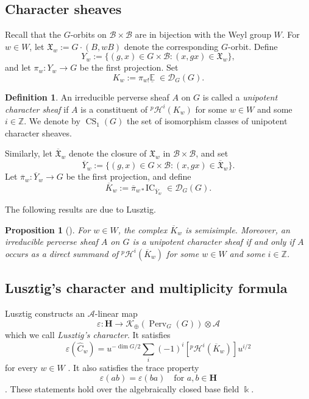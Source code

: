 \documentclass[11pt]{amsart}
\numberwithin{equation}{section}
\newtheorem{proposition}[theorem]{Proposition}
\theoremstyle{definition}
\newtheorem{definition}[theorem]{Definition}
\newcommand\hecke{\mathbf{H}}  %
\def\lra{\longrightarrow }
\def\beq{\begin{equation}}
\def\eeq{\end{equation}}
\DeclareMathOperator{\CS}{\mathrm{CS}}
\DeclareMathOperator{\Perv}{\mathrm{Perv}}
\def\cA{\mathcal {A}}
\def\cB{\mathcal {B}}
\def\cH{\mathcal {H}}
\def\EE{\mathbb{E}}
\def\ZZ{\mathbb{Z}}
\def\fX{\mathfrak {X}}
\begin{document}
\subsection{Character sheaves}
Recall that the $G$-orbits on $\mathcal B \times \mathcal B$ are in bijection with the Weyl group $W$.
For $w\in W$, let
$\fX_w := G \cdot (B, wB)$
denote the corresponding $G$-orbit. 
Define
\[Y_w := \{(g, x) \in G \times \mathcal B : (x, gx) \in \fX_w\},\]
and let $\pi_w : Y_w \to G$ be the first projection.
Set
\[K_w := \pi_{w!} \underline{\EE} \;\in \mathscr D_G(G).\]

\begin{definition}
	An irreducible perverse sheaf $A$ on $G$ is called a \emph{unipotent character sheaf} if $A$ is a constituent of ${}^p\cH^i(K_w)$ for some $w \in W$ and some $i\in\ZZ$.
	We denote by $\CS_1(G)$ the set of isomorphism classes of unipotent character sheaves. 
\end{definition}

Similarly, let $\overline{\fX}_w$ denote the closure of $\fX_w$ in $\cB\times \cB$, and  set
\[\overline{Y}_w := \{(g, x) \in G \times \mathcal B : (x, gx) \in \overline{\fX}_w\}.\]
Let $\overline{\pi}_w : \overline{Y}_w \to G$ be the first projection, and define
\[\overline{K}_w := \overline{\pi}_{w*} \mathrm{IC}_{\overline{Y}_w} \;\in \mathscr D_G(G).\]

The following results are due to Lusztig.

\begin{proposition}[{\cite[Propositions~12.7 and~12.8]{Lus85ii}}]\label{prop:Kbarw}
	For $w\in W$, the complex $\overline{K}_w$ is semisimple. Moreover, an irreducible perverse sheaf $A$ on $G$ is a unipotent character sheaf if and only if $A$ occurs as a direct summand of ${}^p\cH^i(\overline{K}_w)$ for some $w \in W$ and some $i\in \ZZ$.
\end{proposition}







\subsection{Lusztig's character and multiplicity formula}
\label{s families}\label{ss:lusztig.character}

Lusztig constructs an $\cA$-linear map
\[
\varepsilon:\hecke\lra\mathscr K_\oplus(\Perv_G(G))\otimes\cA
\]
which we call \emph{Lusztig's character}. It satisfies
\beq\label{eq:epsilon.KL}
\varepsilon(\widehat C_w) = u^{-\dim G/2}\sum_i(-1)^i[{}^p\cH^i(\overline K_w)]u^{i/2}
\eeq
for every $w\in W$
\cite[Proposition~12.10]{Lus85ii}.
It also satisfies the trace property
\[
\varepsilon(ab)=\varepsilon(ba) \quad\text{for }a,b\in\hecke
\]
\cite[Proposition~6.2]{Lus85}.
These statements hold over the algebraically closed
base field $\Bbbk$.
\end{document}
